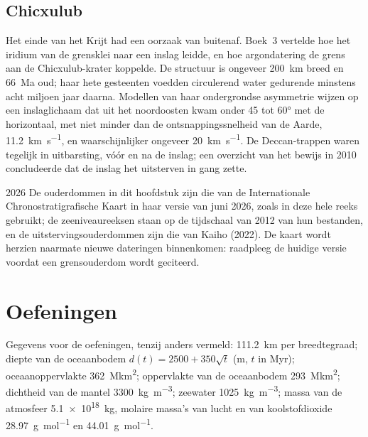 \subsection*{Chicxulub}

Het einde van het Krijt had een oorzaak van buitenaf. Boek~3 vertelde hoe het iridium van de
grensklei naar een inslag leidde, en hoe argondatering de grens aan de Chicxulub-krater koppelde.
De structuur is ongeveer \qty{200}{km} breed en \qty{66}{Ma} oud; haar
hete gesteenten voedden circulerend water gedurende minstens acht miljoen jaar daarna. Modellen van haar ondergrondse
asymmetrie wijzen op een inslaglichaam dat uit het noordoosten kwam onder 45 tot \ang{60} met de horizontaal,
met niet minder dan de ontsnappingssnelheid van de Aarde, \qty{11.2}{km.s^{-1}}, en waarschijnlijker ongeveer
\qty{20}{km.s^{-1}}. De Deccan-trappen waren tegelijk in uitbarsting, vóór en na de
inslag; een overzicht van het bewijs in 2010 concludeerde dat de inslag het uitsterven in gang zette.

\begin{dated}{2026}
De ouderdommen in dit hoofdstuk zijn die van de Internationale Chronostratigrafische Kaart in haar versie van juni
2026, zoals in deze hele reeks gebruikt; de zeeniveaureeksen staan op de tijdschaal van 2012
van hun bestanden, en de uitstervingsouderdommen zijn die van Kaiho (2022). De kaart wordt herzien naarmate nieuwe
dateringen binnenkomen: raadpleeg de huidige versie voordat een grensouderdom wordt geciteerd.
\end{dated}

\section*{Oefeningen}\label{sec:b2:phanerozoic-earth:exercises}

Gegevens voor de oefeningen, tenzij anders vermeld: \qty{111.2}{km} per breedtegraad; diepte
van de oceaanbodem $d(t) = 2500 + 350\sqrt t$ (\unit{m}, $t$ in \unit{Myr}); oceaanoppervlakte
\qty{362}{\mega km^2}; oppervlakte van de oceaanbodem \qty{293}{\mega km^2}; dichtheid van de mantel
\qty{3300}{kg.m^{-3}}; zeewater \qty{1025}{kg.m^{-3}}; massa van de atmosfeer
\qty{5.1e18}{kg}, molaire massa's van lucht en van koolstofdioxide \qty{28.97}{g.mol^{-1}} en
\qty{44.01}{g.mol^{-1}}.

